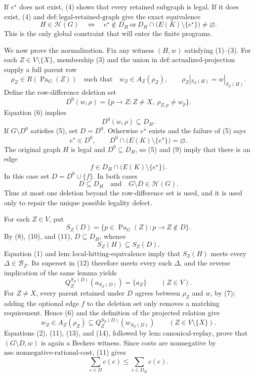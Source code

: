 If \(e^\star\) does not exist, (4) shows that every retained subgraph is legal.  If it does exist, (4) and \(\mathrm{def:legal\mbox{-}retained\mbox{-}graph}\) give the exact equivalence
\[
 H\in\mathcal H(G)
 \quad\Longleftrightarrow\quad
 e^\star\notin D_H
 \ \text{or}\ 
 D_H\cap\bigl(E(K)\setminus\{e^\star\}\bigr)\ne\varnothing.          \tag{5}
\]
This is the only global constraint that will enter the finite programs.

We now prove the normalization.  Fix any witness \((H,w)\) satisfying (1)--(3).  For each \(Z\in V\setminus\{X\}\), membership (3) and the union in \(\mathrm{def:actualized\mbox{-}projection}\) supply a full parent row
\[
 \rho_Z\in R(\operatorname{Pa}_G(Z))
 \quad\text{such that}\quad
 w_Z\in A_Z(\rho_Z),
 \qquad
 \rho_Z|_{S_Z(H)}=w|_{S_Z(H)}.                                        \tag{6}
\]
Define the row-difference deletion set
\[
 D^0(w,\rho)
 =\{p\to Z:Z\ne X,\ \rho_{Z,p}\ne w_p\}.                             \tag{7}
\]
Equation (6) implies
\[
 D^0(w,\rho)\subseteq D_H.                                            \tag{8}
\]
If \(G\setminus D^0\) satisfies (5), set \(D=D^0\).  Otherwise \(e^\star\) exists and the failure of (5) says
\[
 e^\star\in D^0,
 \qquad
 D^0\cap\bigl(E(K)\setminus\{e^\star\}\bigr)=\varnothing.           \tag{9}
\]
The original graph \(H\) is legal and \(D^0\subseteq D_H\), so (5) and (9) imply that there is an edge
\[
 f\in D_H\cap\bigl(E(K)\setminus\{e^\star\}\bigr).                  \tag{10}
\]
In this case set \(D=D^0\cup\{f\}\).  In both cases
\[
 D\subseteq D_H
 \quad\text{and}\quad
 G\setminus D\in\mathcal H(G).                                      \tag{11}
\]
Thus at most one deletion beyond the row-difference set is used, and it is used only to repair the unique possible legality defect.

For each \(Z\in V\), put
\[
 S_Z(D)=\{p\in\operatorname{Pa}_G(Z):p\to Z\notin D\}.
\]
By (8), (10), and (11), \(D\subseteq D_H\), whence
\[
 S_Z(H)\subseteq S_Z(D).                                               \tag{12}
\]
Equation (1) and \(\mathrm{lem:local\mbox{-}hitting\mbox{-}equivalence}\) imply that \(S_Z(H)\) meets every \(\Delta\in\mathcal B_Z\).  Its superset in (12) therefore meets every such \(\Delta\), and the reverse implication of the same lemma yields
\[
 Q_Z^{S_Z(D)}(a_{S_Z(D)})=\{a_Z\}
 \qquad (Z\in V).                                                     \tag{13}
\]
For \(Z\ne X\), every parent retained under \(D\) agrees between \(\rho_Z\) and \(w\), by (7); adding the optional edge \(f\) to the deletion set only removes a matching requirement.  Hence (6) and the definition of the projected relation give
\[
 w_Z\in A_Z(\rho_Z)
 \subseteq Q_Z^{S_Z(D)}(w_{S_Z(D)})
 \qquad (Z\in V\setminus\{X\}).                                    \tag{14}
\]
Equations (2), (11), (13), and (14), followed by \(\mathrm{lem:canonical\mbox{-}replay}\), prove that \((G\setminus D,w)\) is again a Beckers witness.  Since costs are nonnegative by \(\mathrm{ass:nonnegative\mbox{-}rational\mbox{-}cost}\), (11) gives
\[
 \sum_{e\in D}c(e)\le \sum_{e\in D_H}c(e).                          \tag{15}
\]

